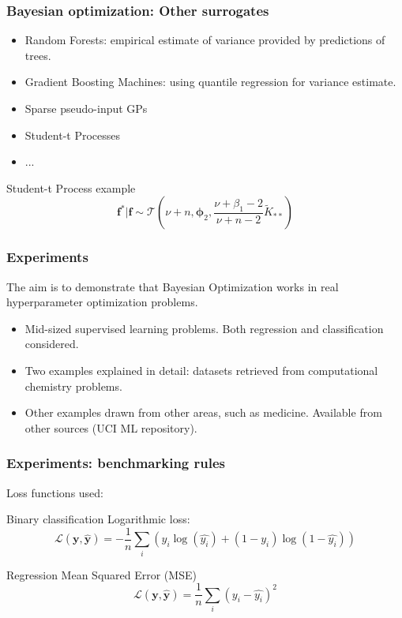 \documentclass[10pt]{beamer}
\begin{document}
		\begin{frame}
		\frametitle{Bayesian optimization: Other surrogates}
		\begin{itemize}
		\item Random Forests: empirical estimate of variance provided by predictions of trees.
		\item Gradient Boosting Machines: using quantile regression for variance estimate.
		\item Sparse pseudo-input GPs
		\item Student-t Processes
		\item ...
		\end{itemize}
		
		\begin{block}{Student-t Process example}
		\begin{equation}
		\boldsymbol{f}^*|\boldsymbol{f} \sim \mathcal{T}\left(\nu + n, \boldsymbol{\phi}_2, \dfrac{\nu + 				\beta_1 - 2}{\nu + n - 2} \tilde{K}_{**} \right)
		\end{equation}
		\end{block}
		\end{frame}
		
		\begin{frame}
			\frametitle{Experiments}
			The aim is to demonstrate that Bayesian Optimization works in real hyperparameter optimization problems.
			\begin{itemize}
				\item Mid-sized supervised learning problems. Both regression and classification considered.
				\item Two examples explained in detail: datasets retrieved from computational chemistry problems.
				\item Other examples drawn from other areas, such as medicine. Available from other sources (UCI ML repository).
			\end{itemize}
		\end{frame}
		
		
		\begin{frame}
		\frametitle{Experiments: benchmarking rules}
		Loss functions used:
		\begin{block}{Binary classification}
		Logarithmic loss:
		\begin{equation}
		\mathcal{L}(\boldsymbol{y}, \boldsymbol{\hat{y}}) = -\dfrac{1}{n} \sum_i \left(y_i \log(\hat{y_i}) + 			(1 - y_i)\log(1-\hat{y_i})\right)
		\end{equation}
		\end{block}
		
		\begin{block}{Regression}
		Mean Squared Error (MSE)
		\begin{equation}
		\mathcal{L}(\boldsymbol{y}, \boldsymbol{\hat{y}}) = \dfrac{1}{n} \sum_i \left(y_i - \hat{y_i}\right)^2
		\end{equation}
		\end{block}
		\end{frame}
		
\end{document}
